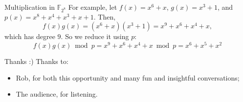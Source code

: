 \documentclass[aspectratio=169]{beamer}
\newcommand*{\F}{\mathbb{F}}
\begin{document}
\begin{frame}{Multiplication in \(\F_{2^8}\)}
  For example, let \(f(x) = x^6 + x\), \(g(x) = x^3 + 1\), and \(p(x) = x^8 +
  x^4 + x^3 + x + 1\).
  \pause
  Then,
  \[ f(x)g(x) = (x^6 + x)(x^3 + 1) = x^9 + x^6 + x^4 + x, \]
  which has degree \(9\). \pause So we reduce it using \(p\):
  \[ f(x)g(x) \bmod{p} = x^9 + x^6 + x^4 + x \bmod{p} = x^6 + x^5 + x^2 \]
\end{frame}

\begin{frame}{Thanks :)}
  Thanks to:
  \begin{itemize}
    \item Rob, for both this opportunity and many fun and insightful conversations;
    \item The audience, for listening.
  \end{itemize}
\end{frame}
\end{document}
